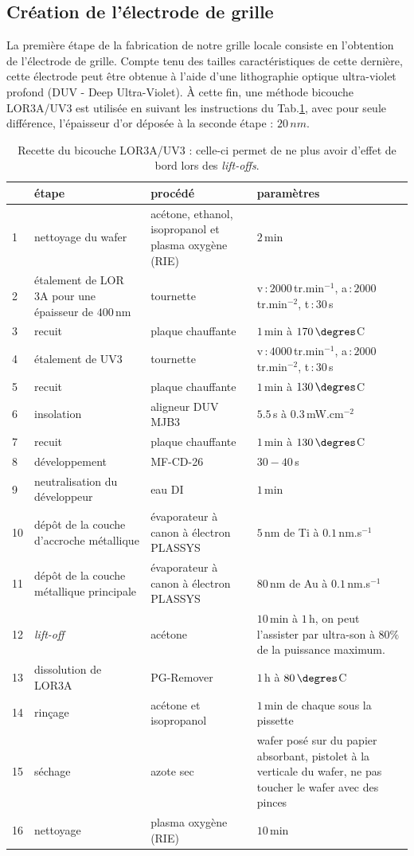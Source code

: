 \subsection{Création de l'électrode de grille}

La première étape de la fabrication de notre grille locale consiste en l'obtention de l'électrode de grille. Compte tenu des tailles caractéristiques de cette dernière, cette électrode peut \^etre obtenue à l'aide d'une lithographie optique ultra-violet profond (DUV - Deep Ultra-Violet). À cette fin, une méthode bicouche LOR3A/UV3 est utilisée en suivant les instructions du Tab.\ref{tab_recette}, avec pour seule différence, l'épaisseur d'or déposée à la seconde étape : $20\,nm$.

\begin{table}
\begin{center}
\begin{tabular}{|p{0.5cm}|p{4cm}|p{4cm}|p{3cm}|}
  \hline
\,& \textbf{étape} & \textbf{procédé} & \textbf{paramètres} \tabularnewline
\hline
1 &  nettoyage du wafer & acétone, ethanol, isopropanol et plasma oxygène (RIE)& $2\,$min \tabularnewline
\hline
 2 & étalement de LOR 3A pour une épaisseur de $400\,$nm& tournette & v\,:\,$2000\,$tr.min$^{-1}$, a\,:\,$2000\,$tr.min$^{-2}$, t\,:\,$30\,$s \tabularnewline
\hline
 3 & recuit & plaque chauffante & $1\,$min à $170\,\degres$C \tabularnewline
\hline
4 & étalement de UV3 & tournette & v\,:\,$4000\,$tr.min$^{-1}$, a\,:\,$2000\,$tr.min$^{-2}$, t\,:\,$30\,$s \tabularnewline
\hline
5 & recuit & plaque chauffante & $1\,$min à $130\,\degres$C \tabularnewline
\hline
6 & insolation & aligneur DUV MJB3 & $5.5\,$s à $0.3\,$mW.cm$^{-2}$\tabularnewline
\hline
7 & recuit & plaque chauffante & $1\,$min à $130\,\degres$C \tabularnewline
\hline
8 & développement & MF-CD-26 & $30-40\,$s\tabularnewline
\hline
9 & neutralisation du développeur & eau DI & $1\,$min\tabularnewline
\hline
10 & dépôt de la couche d'accroche métallique & évaporateur à canon à électron PLASSYS & $5\,$nm de Ti à $0.1\,$nm.s$^{-1}$ \tabularnewline
\hline
11 & dépôt de la couche métallique principale & évaporateur à canon à électron PLASSYS & $80\,$nm de Au à $0.1\,$nm.s$^{-1}$ \tabularnewline
\hline
12 & \textit{lift-off} & acétone & $10\,$min à $1\,$h, on peut l'assister par ultra-son à $80\%$ de la puissance maximum. \tabularnewline
\hline
 13 & dissolution de LOR3A & PG-Remover & $1\,$h à $80\,\degres$C \tabularnewline
\hline
14 & rinçage & acétone et isopropanol & $1\,$min de chaque sous la pissette\tabularnewline
\hline
15 & séchage & azote sec & wafer posé sur du papier absorbant, pistolet à la verticale du wafer, ne pas toucher le wafer avec des pinces\tabularnewline
\hline
16 & nettoyage & plasma oxygène (RIE)& $10\,$min\tabularnewline
\hline
\end{tabular}
\caption{Recette du bicouche LOR3A/UV3 : celle-ci permet de ne plus avoir d'effet de bord lors des \textit{lift-offs}.}
\label{tab_recette}
\end{center}
\end{table}


